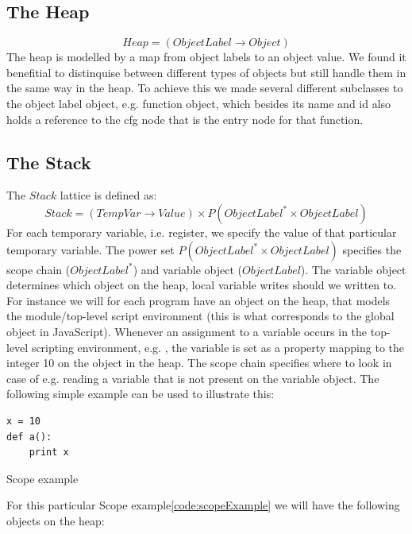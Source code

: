 \subsection{The Heap}
\begin{equation*}
Heap = (ObjectLabel \rightarrow Object)
\end{equation*}
The heap is modelled by a map from object labels to an object value. We found it benefitial to distinquise between different types of objects but still handle them in the same way in the heap.
To achieve this we made several different subclasses to the object label object, e.g. function object, which besides its name and id also holds a reference to the cfg node that is the entry node for that function.


\subsection{The Stack}
The $Stack$ lattice is defined as:
\begin{equation*}
Stack = (TempVar \rightarrow Value) \times P(ObjectLabel^{*} \times ObjectLabel)
\end{equation*}
For each temporary variable, i.e. register, we specify the value of that particular temporary variable. The power set $P(ObjectLabel^{*} \times ObjectLabel)$ specifies the scope chain ($ObjectLabel^{*}$) and variable object ($ObjectLabel$). The variable object determines which object on the heap, local variable writes should we written to. For instance we will for each program have an object on the heap, that models the module/top-level script environment \cite{pyref.main} (this is what corresponds to the global object in JavaScript). Whenever an assignment to a variable occurs in the top-level scripting environment, e.g. , the variable  is set as a property mapping to the integer 10 on the  object in the heap.
The scope chain specifies where to look in case of e.g. reading a variable that is not present on the variable object. The following simple example can be used to illustrate this:
\begin{listing}[H]
	\begin{verbatim}
x = 10 
def a():
	print x
	\end{verbatim}
\caption{Scope example}\label{code:ScopeExample}
\end{listing}
For this particular Scope example\ref{code:scopeExample} we will have the following objects on the heap:
